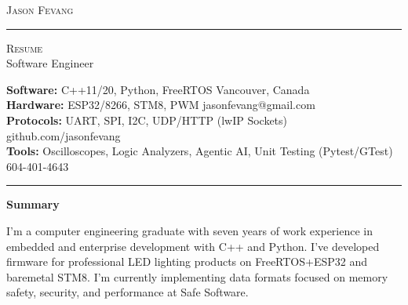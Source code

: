 \documentclass[10pt,A4]{article}
\newcommand{\cvsection}[1]
{
    \begin{center}
        \large\textcolor{sectcol}{\textbf{#1}}
    \end{center}
}
\newcommand{\metasection}[2]
{
\footnotesize{#2} \hspace*{\fill} \footnotesize{#1}\\[1pt]
}
\begin{document}
\pagestyle{fancy}



\vspace{-8pt}
\begin{center}
    \HUGE \textsc{Jason Fevang} \textcolor{sectcol}{\rule[-1mm]{1mm}{0.9cm}} \textsc{Resume}\\[2pt]
    \small Software Engineer
\end{center}

\vspace{6pt}

\metasection{Vancouver, Canada}{\textbf{Software:} C++11/20, Python, FreeRTOS}
\metasection{jasonfevang@gmail.com}{\textbf{Hardware:} ESP32/8266, STM8, PWM}
\metasection{github.com/jasonfevang}{\textbf{Protocols:} UART, SPI, I2C, UDP/HTTP (lwIP Sockets)}
\metasection{604-401-4643}{\textbf{Tools:} Oscilloscopes, Logic Analyzers, Agentic AI, Unit Testing (Pytest/GTest)}
\vspace{-2pt}
\textcolor{softcol}{\hrule}
\vspace{6pt}

\normalsize

\vspace{-6pt}
\cvsection{Summary}
I'm a computer engineering graduate with seven years of work experience in embedded and enterprise development with C++ and Python. I've developed firmware for professional LED lighting products on FreeRTOS+ESP32 and baremetal STM8. I'm currently implementing data formats focused on memory safety, security, and performance at Safe Software.
\end{document}

